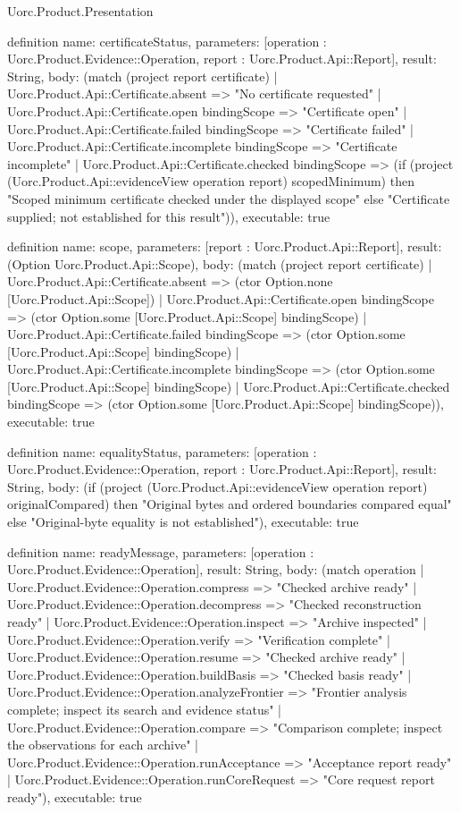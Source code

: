\begin{lexlean}{Uorc.Product.Presentation}
\begin{semanticmodule}
definition{
  name: certificateStatus,
  parameters: [operation : Uorc.Product.Evidence::Operation, report : Uorc.Product.Api::Report],
  result: String,
  body: (match (project report certificate)
    | Uorc.Product.Api::Certificate.absent => "No certificate requested"
    | Uorc.Product.Api::Certificate.open bindingScope => "Certificate open"
    | Uorc.Product.Api::Certificate.failed bindingScope => "Certificate failed"
    | Uorc.Product.Api::Certificate.incomplete bindingScope => "Certificate incomplete"
    | Uorc.Product.Api::Certificate.checked bindingScope => (if (project (Uorc.Product.Api::evidenceView operation report) scopedMinimum) then "Scoped minimum certificate checked under the displayed scope" else "Certificate supplied; not established for this result")),
  executable: true
}

definition{
  name: scope,
  parameters: [report : Uorc.Product.Api::Report],
  result: (Option Uorc.Product.Api::Scope),
  body: (match (project report certificate)
    | Uorc.Product.Api::Certificate.absent => (ctor Option.none [Uorc.Product.Api::Scope])
    | Uorc.Product.Api::Certificate.open bindingScope => (ctor Option.some [Uorc.Product.Api::Scope] bindingScope)
    | Uorc.Product.Api::Certificate.failed bindingScope => (ctor Option.some [Uorc.Product.Api::Scope] bindingScope)
    | Uorc.Product.Api::Certificate.incomplete bindingScope => (ctor Option.some [Uorc.Product.Api::Scope] bindingScope)
    | Uorc.Product.Api::Certificate.checked bindingScope => (ctor Option.some [Uorc.Product.Api::Scope] bindingScope)),
  executable: true
}

definition{
  name: equalityStatus,
  parameters: [operation : Uorc.Product.Evidence::Operation, report : Uorc.Product.Api::Report],
  result: String,
  body: (if (project (Uorc.Product.Api::evidenceView operation report) originalCompared) then "Original bytes and ordered boundaries compared equal" else "Original-byte equality is not established"),
  executable: true
}

definition{
  name: readyMessage,
  parameters: [operation : Uorc.Product.Evidence::Operation],
  result: String,
  body: (match operation
    | Uorc.Product.Evidence::Operation.compress => "Checked archive ready"
    | Uorc.Product.Evidence::Operation.decompress => "Checked reconstruction ready"
    | Uorc.Product.Evidence::Operation.inspect => "Archive inspected"
    | Uorc.Product.Evidence::Operation.verify => "Verification complete"
    | Uorc.Product.Evidence::Operation.resume => "Checked archive ready"
    | Uorc.Product.Evidence::Operation.buildBasis => "Checked basis ready"
    | Uorc.Product.Evidence::Operation.analyzeFrontier => "Frontier analysis complete; inspect its search and evidence status"
    | Uorc.Product.Evidence::Operation.compare => "Comparison complete; inspect the observations for each archive"
    | Uorc.Product.Evidence::Operation.runAcceptance => "Acceptance report ready"
    | Uorc.Product.Evidence::Operation.runCoreRequest => "Core request report ready"),
  executable: true
}


\end{semanticmodule}
\end{lexlean}
